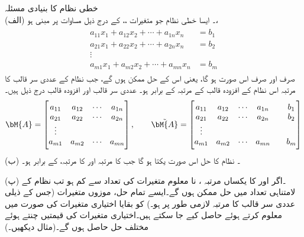 \quad خطی نظام کا بنیادی مسئلہ\\
(الف) ۔ ایسا خطی نظام جو  متغیرات ،، کے درج ذیل  مساوات پر مبنی ہو،
\begin{gather}
\begin{aligned}\label{مساوات_الجبرا_نظام_وجودیت_یکتائی_حل_الف}
a_{11}x_1+a_{12}x_2+\cdots+a_{1n}x_n&=b_1\\
a_{21}x_1+a_{22}x_2+\cdots+a_{2n}x_n&=b_2\\
\vdots\\
a_{m1}x_1+a_{m2}x_2+\cdots+a_{mn}x_n&=b_m
\end{aligned}
\end{gather}
صرف اور صرف اس صورت  ہو گا، یعنی اس کے حل ممکن ہوں گے، جب  نظام کے عددی سر قالب  کا مرتبہ اس نظام کے افزودہ قالب  کے مرتبہ کے برابر ہو۔ عددی سر قالب اور افزودہ قالب درج ذیل ہیں۔
\begin{align*}
\bM{A}=
\begin{bmatrix} 
a_{11}&a_{12}&\cdots & a_{1n}\\
a_{21}&a_{22}&\cdots & a_{2n}\\
\vdots\\
a_{m1}&a_{m2}&\cdots & a_{mn}
\end{bmatrix},\quad \quad \tilde{\bM{A}}=
\begin{bmatrix} 
a_{11}&a_{12}&\cdots & a_{1n}&& b_1\\
a_{21}&a_{22}&\cdots & a_{2n}&& b_2\\
\vdots\\
a_{m1}&a_{m2}&\cdots & a_{mn}&&b_m
\end{bmatrix}
\end{align*}
(ب) ۔ نظام  کا حل اس صورت یکتا ہو گا جب  کا مرتبہ اور  کا مرتبہ،  کے برابر ہو۔ 

(پ) ۔اگر  اور  کا یکساں مرتبہ ، نا معلوم متغیرات کی تعداد  سے کم ہو تب نظام  کے لامتناہی تعداد میں حل ممکن ہوں گے۔ایسے تمام حل،  موزوں متغیرات (جس کے ذیلی عددی سر قالب کا مرتبہ لازمی طور پر ہو۔) کو بقایا  اختیاری متغیرات  کی صورت میں معلوم کرتے ہوئے حاصل کیے جا سکتے ہیں۔اختیاری متغیرات کی قیمتیں چنتے ہوئے مختلف حل حاصل ہوں گے۔(مثال  دیکھیں۔)

